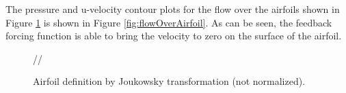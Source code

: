 \documentclass[12pt]{aiaa-pretty}
\begin{document}
The pressure and u-velocity contour plots for the flow over the airfoils shown in Figure \ref{fig:joukowskiChamber} is shown in Figure \ref{fig:flowOverAirfoil}. As can be seen, the feedback forcing function is able to bring the velocity to zero on the surface of the airfoil.

%
	\begin{figure}[H]
		\centering
		\quad
		//
		\quad
		\caption{Airfoil definition by Joukowsky transformation (not normalized).}
		\label{fig:joukowskiChamber}
	\end{figure}
%
\end{document}
